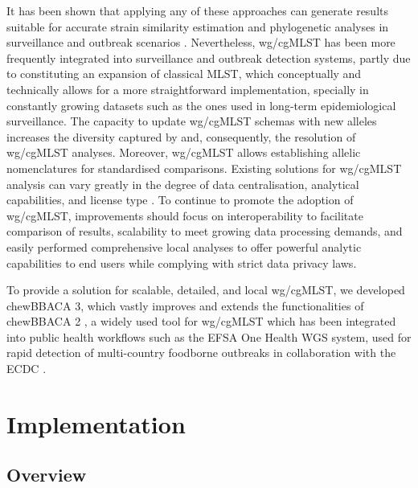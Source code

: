 It has been shown that applying any of these approaches can generate results suitable for accurate strain similarity estimation and phylogenetic analyses in surveillance and outbreak scenarios \citep{uelze_typing_2020, bush_genomic_2020, valiente-mullor_one_2021, ndiaye_when_2024, belbasi_minimizer_2022, king_comparison_2024}. Nevertheless, \ac{wg/cgMLST} has been more frequently integrated into surveillance and outbreak detection systems, partly due to constituting an expansion of classical \ac{MLST}, which conceptually and technically allows for a more straightforward implementation, specially in constantly growing datasets such as the ones used in long-term epidemiological surveillance. The capacity to update \ac{wg/cgMLST} schemas with new alleles increases the diversity captured by and, consequently, the resolution of \ac{wg/cgMLST} analyses. Moreover, \ac{wg/cgMLST} allows establishing allelic nomenclatures for standardised comparisons. Existing solutions for \ac{wg/cgMLST} analysis can vary greatly in the degree of data centralisation, analytical capabilities, and license type \citep{jolley_bigsdb_2010, zhou_enterobase_2020, mamede_chewie_2021}. To continue to promote the adoption of \ac{wg/cgMLST}, improvements should focus on interoperability to facilitate comparison of results, scalability to meet growing data processing demands, and easily performed comprehensive local analyses to offer powerful analytic capabilities to end users while complying with strict data privacy laws.

To provide a solution for scalable, detailed, and local \ac{wg/cgMLST}, we developed chewBBACA 3, which vastly improves and extends the functionalities of chewBBACA 2 \citep{mamede_chewie_2021, silva_chewbbaca_2018}, a widely used tool for \ac{wg/cgMLST} which has been integrated into public health workflows such as the \ac{EFSA} One Health \ac{WGS} system, used for rapid detection of multi-country foodborne outbreaks in collaboration with the \ac{ECDC} \citep{authority_efsa_guidelines_2022}.

\section{Implementation} \label{sec:ch2_implementation}

\subsection{Overview} \label{ssec:ch2_implementation_overview}

